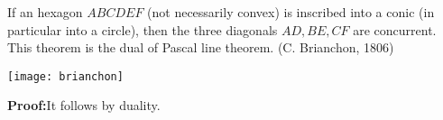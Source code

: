\documentclass[12pt]{article}
\begin{document}
If an hexagon $ABCDEF$ (not necessarily convex) is inscribed into
a conic (in particular into a circle), then the three diagonals
$AD, BE, CF$ are concurrent. This theorem is the dual of Pascal
line theorem. (C. Brianchon, 1806)
\begin{center}
\texttt{[image: brianchon]}
\end{center}

\textbf{Proof:}It follows by duality.
\end{document}
